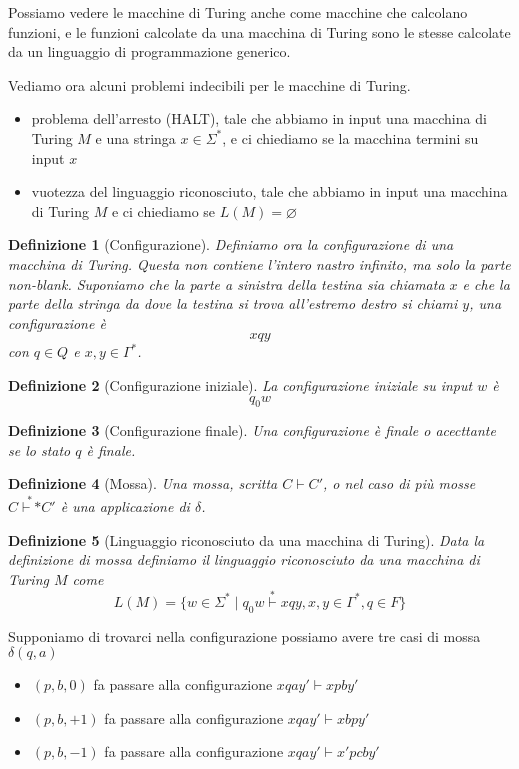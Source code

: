 \documentclass[12pt]{article}
\newtheorem{definizione}{Definizione}
\begin{document}
Possiamo vedere le macchine di Turing anche come macchine che calcolano funzioni, e le funzioni calcolate da una macchina di Turing sono le stesse calcolate da un linguaggio di programmazione generico.

Vediamo ora alcuni problemi indecibili per le macchine di Turing.
\begin{itemize}
	\item problema dell'arresto (HALT), tale che abbiamo in input una macchina di Turing $M$ e una stringa $x \in \Sigma^*$, e ci chiediamo se la macchina termini su input $x$
	\item vuotezza del linguaggio riconosciuto, tale che abbiamo in input una macchina di Turing $M$ e ci chiediamo se $L(M) = \varnothing$
\end{itemize}

\begin{definizione}[Configurazione]
Definiamo ora la configurazione di una macchina di Turing.
Questa non contiene l'intero nastro infinito, ma solo la parte non-blank.
Suponiamo che la parte a sinistra della testina sia chiamata $x$ e che la parte della stringa da dove la testina si trova all'estremo destro si chiami $y$, una configurazione è
$$ xqy $$
con $q \in Q$ e $x, y \in \Gamma^*$.
\end{definizione}

\begin{definizione}[Configurazione iniziale]
	La configurazione iniziale su input $w$ è
	$$ q_0w $$
\end{definizione}
\begin{definizione}[Configurazione finale]
	Una configurazione è finale o acecttante se lo stato $q$ è finale.
\end{definizione}

\begin{definizione}[Mossa]
	Una mossa, scritta $C \vdash C'$, o nel caso di più mosse $C \overset{*}{\vdash*} C'$ è una applicazione di $\delta$.
\end{definizione}

\begin{definizione}[Linguaggio riconosciuto da una macchina di Turing]
	Data la definizione di mossa definiamo il linguaggio riconosciuto da una macchina di Turing $M$ come
	$$ L(M) = \{ w \in \Sigma^* \mid q_0w \overset{*}{\vdash} xqy, x, y \in \Gamma^*, q \in F \} $$
\end{definizione}
Supponiamo di trovarci nella configurazione
possiamo avere tre casi di mossa $\delta(q, a)$
\begin{itemize}
	\item $(p, b, 0)$ fa passare alla configurazione $xqay' \vdash xpby'$
	\item $(p, b, +1)$ fa passare alla configurazione $xqay' \vdash xbpy'$
	\item $(p, b, -1)$ fa passare alla configurazione $xqay' \vdash x'pcby'$
\end{itemize}
\end{document}
